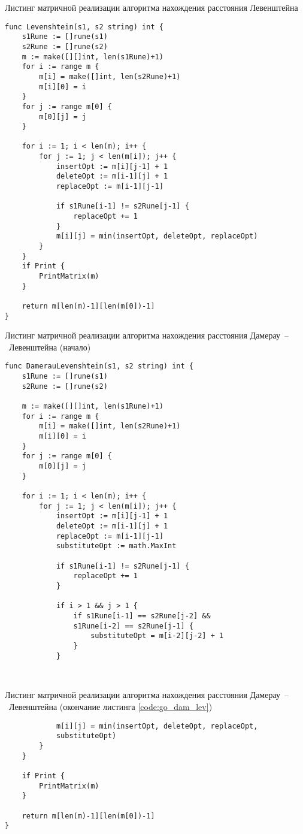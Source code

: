 \newpage

\begin{code}
\caption{Листинг матричной реализации алгоритма нахождения расстояния Левенштейна}
\label{code:go_lev}

\begin{verbatim}
func Levenshtein(s1, s2 string) int {
	s1Rune := []rune(s1)
	s2Rune := []rune(s2)
	m := make([][]int, len(s1Rune)+1)
	for i := range m {
		m[i] = make([]int, len(s2Rune)+1)
		m[i][0] = i
	}
	for j := range m[0] {
		m[0][j] = j
	}
	
	for i := 1; i < len(m); i++ {
		for j := 1; j < len(m[i]); j++ {
			insertOpt := m[i][j-1] + 1
			deleteOpt := m[i-1][j] + 1
			replaceOpt := m[i-1][j-1]
			
			if s1Rune[i-1] != s2Rune[j-1] {
				replaceOpt += 1
			}
			m[i][j] = min(insertOpt, deleteOpt, replaceOpt)
		}
	}
	if Print {
		PrintMatrix(m)
	}

	return m[len(m)-1][len(m[0])-1]
}
\end{verbatim}
\end{code}

\begin{code}
\caption{Листинг матричной реализации алгоритма нахождения расстояния Дамерау~--~Левенштейна (начало)}
\label{code:go_dam_lev}

\begin{verbatim}
func DamerauLevenshtein(s1, s2 string) int {
	s1Rune := []rune(s1)
	s2Rune := []rune(s2)

	m := make([][]int, len(s1Rune)+1)
	for i := range m {
		m[i] = make([]int, len(s2Rune)+1)
		m[i][0] = i
	}
	for j := range m[0] {
		m[0][j] = j
	}

	for i := 1; i < len(m); i++ {
		for j := 1; j < len(m[i]); j++ {
			insertOpt := m[i][j-1] + 1
			deleteOpt := m[i-1][j] + 1
			replaceOpt := m[i-1][j-1]
			substituteOpt := math.MaxInt

			if s1Rune[i-1] != s2Rune[j-1] {
				replaceOpt += 1
			}

			if i > 1 && j > 1 {
				if s1Rune[i-1] == s2Rune[j-2] && 
				s1Rune[i-2] == s2Rune[j-1] {
					substituteOpt = m[i-2][j-2] + 1
				}
			}

			
\end{verbatim}
\end{code}

\begin{code}
\caption{Листинг матричной реализации алгоритма нахождения расстояния Дамерау~--~Левенштейна (окончание листинга \ref{code:go_dam_lev})}
\label{code:go_dam_lev2}

\begin{verbatim}
			m[i][j] = min(insertOpt, deleteOpt, replaceOpt, 
			substituteOpt)
		}
	}

	if Print {
		PrintMatrix(m)
	}

	return m[len(m)-1][len(m[0])-1]
}
			
\end{verbatim}
\end{code}


